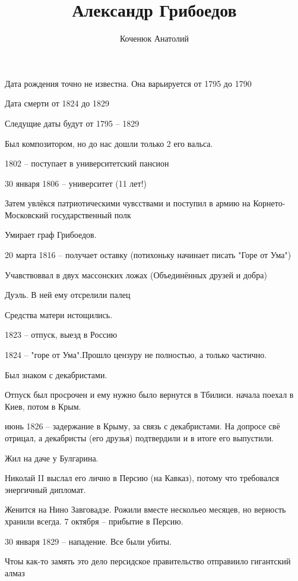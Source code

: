 \documentclass[12pt,a4paper]{article}
\author{Коченюк Анатолий}
\title{Александр Грибоедов}
\begin{document}
\maketitle

Дата рождения точно не известна. Она варьируется от 1795 до 1790

Дата смерти от 1824 до 1829

Следущие даты будут от 1795 -- 1829

Был композитором, но до нас дошли только 2 его вальса.

1802 -- поступает в университетский пансион

30 января 1806 -- университет (11 лет!)

Затем увлёкся патриотическими чувсствами и поступил в армию на Корнето-Московский государственный полк 

Умирает граф Грибоедов.

20 марта 1816 -- получает оставку (потихоньку начинает писать "Горе от Ума")

Учавствоввал в двух массонских ложах (Объединённых друзей и добра)

Дуэль. В ней ему отсрелили палец

Средства матери истощились.

1823 -- отпуск, выезд в Россию

1824 -- "горе от Ума".Прошло цензуру не полностью, а только частично.

Был знаком с декабристами.

Отпуск был просрочен и ему нужно было вернутся в Тбилиси. начала поехал в Киев, потом в Крым.

июнь 1826 -- задержание в Крыму, за связь с декабристами. На допросе свё отрицал, а декабристы (его друзья) подтвердили и в итоге его выпустили.

Жил на даче у Булгарина.

Николай II выслал его лично в Персию (на Кавказ), потому что требовался энергичный дипломат.

Женится на Нино Завговадзе. Рожили вместе нескольео месяцев, но верность хранили всегда.
7 октября -- прибытие в Персию.

30 января 1829 -- нападение. Все были убиты. 

Чтоы как-то замять это дело персидское правительство отправиило гигантский алмаз
\end{document}
